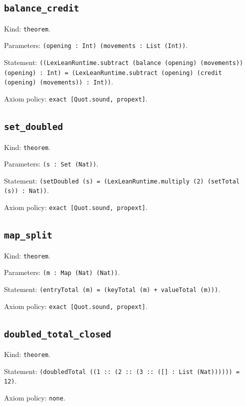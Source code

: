 \documentclass[11pt]{article}
\begin{document}
\subsection*{\texttt{balance\_credit}}
\noindent Kind: \texttt{theorem}.\par
\noindent Parameters: \texttt{(opening : Int) (movements : List (Int))}.\par
\noindent Statement: \texttt{((LexLeanRuntime.subtract (balance (opening) (movements)) (opening) : Int) = (LexLeanRuntime.subtract (opening) (credit (opening) (movements)) : Int))}.\par
\noindent Axiom policy: \texttt{exact [Quot.sound, propext]}.\par
\subsection*{\texttt{set\_doubled}}
\noindent Kind: \texttt{theorem}.\par
\noindent Parameters: \texttt{(s : Set (Nat))}.\par
\noindent Statement: \texttt{(setDoubled (s) = (LexLeanRuntime.multiply (2) (setTotal (s)) : Nat))}.\par
\noindent Axiom policy: \texttt{exact [Quot.sound, propext]}.\par
\subsection*{\texttt{map\_split}}
\noindent Kind: \texttt{theorem}.\par
\noindent Parameters: \texttt{(m : Map (Nat) (Nat))}.\par
\noindent Statement: \texttt{(entryTotal (m) = (keyTotal (m) + valueTotal (m)))}.\par
\noindent Axiom policy: \texttt{exact [Quot.sound, propext]}.\par
\subsection*{\texttt{doubled\_total\_closed}}
\noindent Kind: \texttt{theorem}.\par
\noindent Statement: \texttt{(doubledTotal ((1 :: (2 :: (3 :: ([] : List (Nat)))))) = 12)}.\par
\noindent Axiom policy: \texttt{none}.\par
\end{document}
